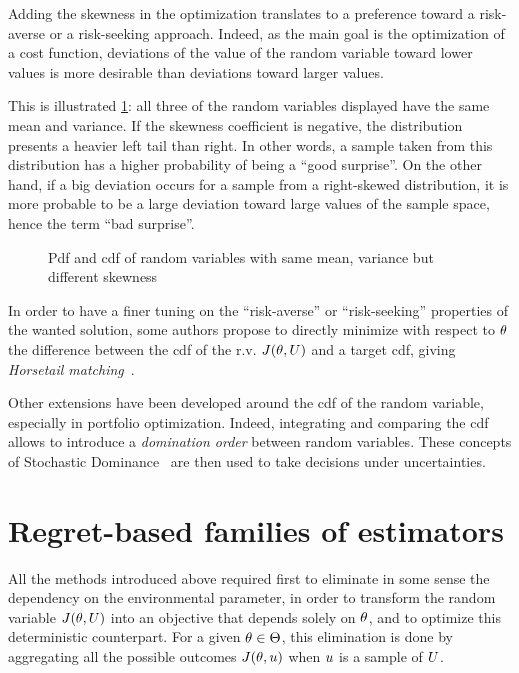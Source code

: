 \documentclass[../../Main_ManuscritThese.tex]{subfiles}
\newcommand\imgpath{/home/victor/acadwriting/Manuscrit/Text/Chapter3/img/}
\begin{document}
Adding the skewness in the optimization translates to a preference toward a risk-averse or a risk-seeking approach. Indeed, as the main goal is the optimization of a cost function, deviations of the value of the random variable toward lower values is more desirable than deviations toward larger values.

This is illustrated \cref{fig:skewness_example}: all three of the random variables displayed have the same mean and variance.
If the skewness coefficient is negative, the distribution presents a heavier left tail than right. In other words, a sample taken from this distribution has a higher probability of being a ``good surprise''. On the other hand, if a big deviation occurs for a sample from a right-skewed distribution, it is more probable to be a large deviation toward large values of the sample space, hence the term ``bad surprise''.

\begin{figure}[ht]
  \centering
  
  \caption{\label{fig:skewness_example} Pdf and cdf of random variables with same mean, variance but different skewness}
\end{figure}

In order to have a finer tuning on the ``risk-averse'' or ``risk-seeking'' properties of the wanted solution, some authors propose to directly minimize with respect to $\theta$ the difference between the cdf of the r.v. $J(\theta, U)$ and a target cdf, giving \emph{Horsetail matching}~\cite{cook_extending_2017,cook_effective_2018}.

Other extensions have been developed around the cdf of the random variable, especially in portfolio optimization. Indeed, integrating and comparing the cdf allows to introduce a \emph{domination order} between random variables. These concepts of Stochastic Dominance~\cite{ogryczak_stochastic_1997} are then used to take decisions under uncertainties. 


\section{Regret-based families of estimators}
\label{sec:rr_family}
All the methods introduced above required first to eliminate in some sense the dependency on the environmental parameter, in order to transform the random variable $J(\theta, U)$ into an objective that depends solely on $\theta$, and to optimize this deterministic counterpart.
For a given $\theta\in\Theta$, this elimination is done by aggregating all the possible outcomes $J(\theta, u)$ when $u$ is a sample of $U$.
\end{document}
